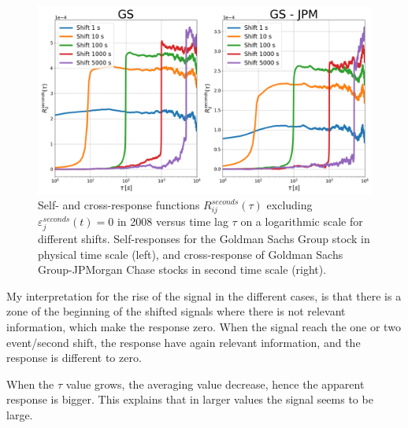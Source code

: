 \begin{figure}[htbp]
    \centering
    \includegraphics[width=\textwidth]{figures/04_shift_responses_time.png}
    \caption{Self- and cross-response functions
             $R^{seconds}_{ij}\left(\tau\right)$ excluding
             $\varepsilon^{seconds}_{j}\left(t\right) = 0$ in 2008 versus time
             lag $\tau$ on a logarithmic scale for different shifts.
             Self-responses for the Goldman Sachs Group stock in physical time
             scale (left), and cross-response of Goldman Sachs Group-JPMorgan
             Chase stocks in second time scale (right).}
    \label{fig:shift_responses_physical_scale}
\end{figure}

My interpretation for the rise of the signal in the different cases, is that there is a zone of the
beginning of the shifted signals where there is not relevant information, which make the response
zero. When the signal reach the one or two event/second shift, the response have again relevant
information, and the response is different to zero.

When the $\tau$ value grows, the averaging value decrease, hence the apparent response is bigger.
This explains that in larger values the signal seems to be large.